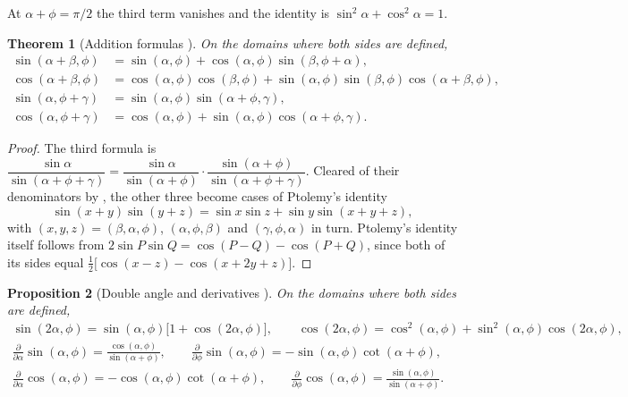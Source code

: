\documentclass[11pt,a4paper]{amsart}
\theoremstyle{plain}
\newtheorem{theorem}{Theorem}[section]
\newtheorem{proposition}[theorem]{Proposition}
\theoremstyle{definition}
\theoremstyle{remark}
\begin{document}
At $\alpha + \phi = \pi/2$ the third term vanishes and the identity is $\sin^2\alpha + \cos^2\alpha = 1$.

\begin{theorem}[Addition formulas {\citep[Theorems~5.5 and~5.7]{Derraz2026GSP}}]\label{thm:gs-addition}
On the domains where both sides are defined,
\begin{align*}
\sin(\alpha + \beta, \phi) &= \sin(\alpha, \phi) + \cos(\alpha, \phi)\sin(\beta, \phi + \alpha) , \\
\cos(\alpha + \beta, \phi) &= \cos(\alpha, \phi)\cos(\beta, \phi) + \sin(\alpha, \phi)\sin(\beta, \phi)\cos(\alpha + \beta, \phi) , \\
\sin(\alpha, \phi + \gamma) &= \sin(\alpha, \phi)\sin(\alpha + \phi, \gamma) , \\
\cos(\alpha, \phi + \gamma) &= \cos(\alpha, \phi) + \sin(\alpha, \phi)\cos(\alpha + \phi, \gamma) .
\end{align*}
\end{theorem}

\begin{proof}
The third formula is $\dfrac{\sin\alpha}{\sin(\alpha + \phi + \gamma)} = \dfrac{\sin\alpha}{\sin(\alpha + \phi)} \cdot \dfrac{\sin(\alpha + \phi)}{\sin(\alpha + \phi + \gamma)}$. Cleared of their denominators by , the other three become cases of Ptolemy's identity
\[
\sin(x + y)\sin(y + z) = \sin x\sin z + \sin y\sin(x + y + z) ,
\]
with $(x, y, z) = (\beta, \alpha, \phi)$, $(\alpha, \phi, \beta)$ and $(\gamma, \phi, \alpha)$ in turn. Ptolemy's identity itself follows from $2\sin P\sin Q = \cos(P - Q) - \cos(P + Q)$, since both of its sides equal $\tfrac{1}{2}\bigl[\cos(x - z) - \cos(x + 2y + z)\bigr]$.
\end{proof}

\begin{proposition}[Double angle and derivatives {\citep[Propositions~5.9 and~5.12]{Derraz2026GSP}}]\label{prop:gs-double}
On the domains where both sides are defined,
\begin{gather*}
\sin(2\alpha, \phi) = \sin(\alpha, \phi)\bigl[1 + \cos(2\alpha, \phi)\bigr] , \qquad \cos(2\alpha, \phi) = \cos^2(\alpha, \phi) + \sin^2(\alpha, \phi)\cos(2\alpha, \phi) , \\[3pt]
\frac{\partial}{\partial\alpha}\sin(\alpha, \phi) = \frac{\cos(\alpha, \phi)}{\sin(\alpha + \phi)} , \qquad \frac{\partial}{\partial\phi}\sin(\alpha, \phi) = -\sin(\alpha, \phi)\cot(\alpha + \phi) , \\[3pt]
\frac{\partial}{\partial\alpha}\cos(\alpha, \phi) = -\cos(\alpha, \phi)\cot(\alpha + \phi) , \qquad \frac{\partial}{\partial\phi}\cos(\alpha, \phi) = \frac{\sin(\alpha, \phi)}{\sin(\alpha + \phi)} .
\end{gather*}
\end{proposition}
\end{document}
